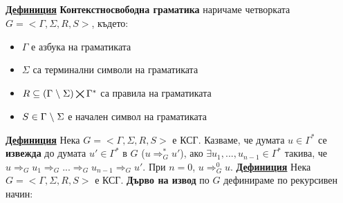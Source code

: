 \documentclass{article}
\begin{document}
\subsection*{\color{lightBlue}{5. Контекстносвободни граматики и езици. Стекови автомати.}}
\textbf{\underline{Дефиниция}}
\textbf{Контекстносвободна граматика} наричаме четворката \newline $G = <\Gamma, \Sigma, R, S>$, където:
\begin{itemize}
    \item $\Gamma$ е азбука на граматиката
    \item $\Sigma$ са терминални символи на граматиката
    \item $R \subseteq (\Gamma \hspace{0.1cm} \backslash \hspace{0.1cm} \Sigma) \bigtimes \Gamma^*$ са правила на граматиката
    \item $S \in \Gamma \hspace{0.1cm} \backslash \hspace{0.1cm} \Sigma$ е начален символ на граматиката
\end{itemize}
\textbf{\underline{Дефиниция}} Нека $G = <\Gamma, \Sigma, R, S>$ е КСГ. Казваме, че думата $u \in \Gamma^*$ се \textbf{извежда} до
думата $u' \in \Gamma^*$ в $G$ ($u \Rightarrow^*_G u'$), ако $\exists u_1, ..., u_{n-1} \in \Gamma^*$ такива, че $u \Rightarrow_G u_1
\Rightarrow_G ... \Rightarrow_G u_{n-1} \Rightarrow_G u'$. При $n = 0$, $u \Rightarrow_G^0 u$. \newline\newline
\textbf{\underline{Дефиниция}}
Нека $G = <\Gamma, \Sigma, R, S>$ е КСГ. \textbf{Дърво на извод} по $G$ дефинираме по рекурсивен начин:
\end{document}
